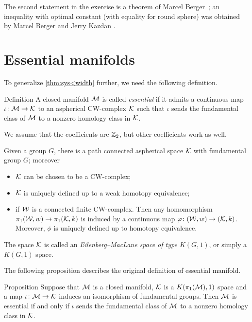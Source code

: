 The second statement in the exercise is a theorem of Marcel Berger~\cite{berger-n};
an inequality with optimal constant (with equality for round sphere) was obtained by Marcel Berger and Jerry Kazdan \cite{berger-kazdan}. 


\section{Essential manifolds}

To generalize \ref{thm:sys<width} further, we need the following definition.

\begin{thm}{Definition}\label{def:essential}
A closed manifold $\mathcal{M}$ is called \emph{essential} if it admits a continuous map $\iota\colon\mathcal{M}\to \mathcal{K}$ to an aspherical CW-complex $\mathcal{K}$ such that $\iota$ sends the fundamental class of $\mathcal{M}$ to a nonzero homology class in $\mathcal{K}$.
\end{thm}

We assume that the coefficients are $\mathbb{Z}_2$, but other coefficients work as well.



Given a group $G$, there is a path connected aspherical space $\mathcal{K}$ with fundamental group $G$; 
moreover 
\begin{itemize}
\item $\mathcal{K}$ can be chosen to be a CW-complex;
\item $\mathcal{K}$ is uniquely defined up to a weak homotopy equivalence;
\item if $\mathcal{W}$ is a connected finite CW-complex.
Then any homomorphism $\pi_1(\mathcal{W},w)\to\pi_1(\mathcal{K},k)$ is induced by a continuous map $\varphi\colon(\mathcal{W},w)\to(\mathcal{K},k)$.
Moreover, $\phi$ is uniquely defined up to homotopy equivalence.
\end{itemize}
The space $\mathcal{K}$ is called an \emph{Eilenberg--MacLane space of type $K(G,1)$}, or simply a $K(G,1)$ space.

The following proposition describes the original definition of essential manifold.

\begin{thm}{Proposition}\label{prop:essentioal-K(pi,1)}
Suppose that $\mathcal{M}$ is a closed manifold, 
$\mathcal{K}$ is a $K(\pi_1(\mathcal{M}),1)$ space and a map $\iota\colon\mathcal{M}\to \mathcal{K}$ induces an isomorphism of fundamental groups.
Then $\mathcal{M}$ is essential if and only if $\iota$ sends the fundamental class of $\mathcal{M}$ to a nonzero homology class in $\mathcal{K}$.
\end{thm}

